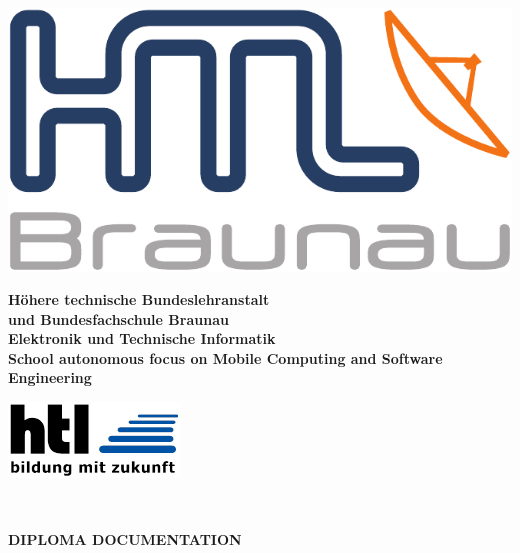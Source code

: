 
\pagebreak
\thispagestyle{empty}

\begin{minipage}[c]{0.20\linewidth}
\includegraphics[width=0.8\linewidth]{media/images/htl_c_cmyk_rein}
\end{minipage}
\begin{minipage}[c]{0.6\linewidth}
\begin{center}
{\bfseries\sffamily\large Höhere  technische  Bundeslehranstalt\\
und  Bundesfachschule  Braunau\\
Elektronik und Technische Informatik\\
{\normalsize School autonomous focus on Mobile Computing and Software Engineering} }
\end{center}
\end{minipage}
\begin{minipage}[c]{0.2\linewidth}
\hfill \includegraphics[width=0.8\linewidth]{media/images/htl-bildung-mit-zukunft}
\end{minipage}\\

\vspace{1em}
\begin{center}
\bfseries\sffamily\Large
DIPLOMA DOCUMENTATION
\end{center}
\vspace{1ex}

